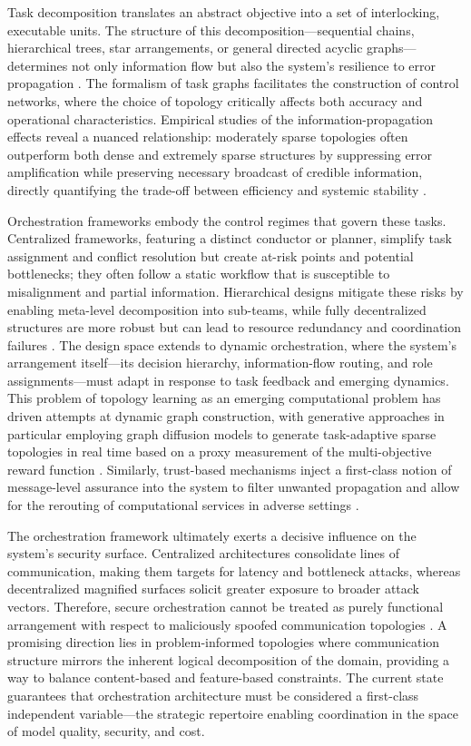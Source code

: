 \documentclass[11pt,a4paper]{article}
\begin{document}
Task decomposition translates an abstract objective into a set of interlocking, executable units. The structure of this decomposition---sequential chains, hierarchical trees, star arrangements, or general directed acyclic graphs---determines not only information flow but also the system's resilience to error propagation \cite{arxiv:2505.23352v1}. The formalism of task graphs facilitates the construction of control networks, where the choice of topology critically affects both accuracy and operational characteristics. Empirical studies of the information-propagation effects reveal a nuanced relationship: moderately sparse topologies often outperform both dense and extremely sparse structures by suppressing error amplification while preserving necessary broadcast of credible information, directly quantifying the trade-off between efficiency and systemic stability \cite{arxiv:2505.23352v1}.

Orchestration frameworks embody the control regimes that govern these tasks. Centralized frameworks, featuring a distinct conductor or planner, simplify task assignment and conflict resolution but create at-risk points and potential bottlenecks; they often follow a static workflow that is susceptible to misalignment and partial information. Hierarchical designs mitigate these risks by enabling meta-level decomposition into sub-teams, while fully decentralized structures are more robust but can lead to resource redundancy and coordination failures \cite{arxiv:2501.06322v1}. The design space extends to dynamic orchestration, where the system's arrangement itself---its decision hierarchy, information-flow routing, and role assignments---must adapt in response to task feedback and emerging dynamics. This problem of topology learning as an emerging computational problem has driven attempts at dynamic graph construction, with generative approaches in particular employing graph diffusion models to generate task-adaptive sparse topologies in real time based on a proxy measurement of the multi-objective reward function \cite{arxiv:2510.07799v2}. Similarly, trust-based mechanisms inject a first-class notion of message-level assurance into the system to filter unwanted propagation and allow for the rerouting of computational services in adverse settings \cite{arxiv:2506.02546v2}.

The orchestration framework ultimately exerts a decisive influence on the system's security surface. Centralized architectures consolidate lines of communication, making them targets for latency and bottleneck attacks, whereas decentralized magnified surfaces solicit greater exposure to broader attack vectors. Therefore, secure orchestration cannot be treated as purely functional arrangement with respect to maliciously spoofed communication topologies \cite{arxiv:2502.14847v2}. A promising direction lies in problem-informed topologies where communication structure mirrors the inherent logical decomposition of the domain, providing a way to balance content-based and feature-based constraints. The current state guarantees that orchestration architecture must be considered a first-class independent variable---the strategic repertoire enabling coordination in the space of model quality, security, and cost.
\end{document}

